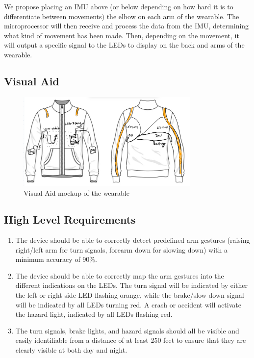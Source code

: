 \documentclass[12pt]{article}
\begin{document}
We propose placing an IMU above (or below depending on how hard 
it is to differentiate between movements) the elbow on each arm 
of the wearable. The microprocessor will then receive and process 
the data from the IMU, determining what kind of movement has been 
made. Then, depending on the movement, it will output a specific 
signal to the LEDs to display on the back and arms of the wearable. 

\newpage
\subsection{Visual Aid}
\begin{figure}[ht]
    \centering
    \includegraphics[width=0.8\textwidth]{visual_aid.jpg}
    \caption{Visual Aid mockup of the wearable \cite{VectorStock2024}}
    \label{fig:my_label}
\end{figure}
\subsection{High Level Requirements}
\begin{enumerate}
    \item The device should be able to correctly detect 
    predefined arm gestures (raising right/left arm for turn 
    signals, forearm down for slowing down) with a minimum accuracy of 90\%. 


    \item The device should be able to correctly map the arm 
    gestures into the different indications on the LEDs. The turn signal will be indicated by either the left or right side LED flashing orange, while the brake/slow down signal will be indicated by all LEDs turning red. A crash or accident will activate the hazard light, indicated by all LEDs flashing red. 

    \item The turn signals, brake lights, and hazard signals should all be visible and easily identifiable from a distance of at least 250 feet to ensure that they are clearly visible at both day and night. 


\end{enumerate}
\end{document}
